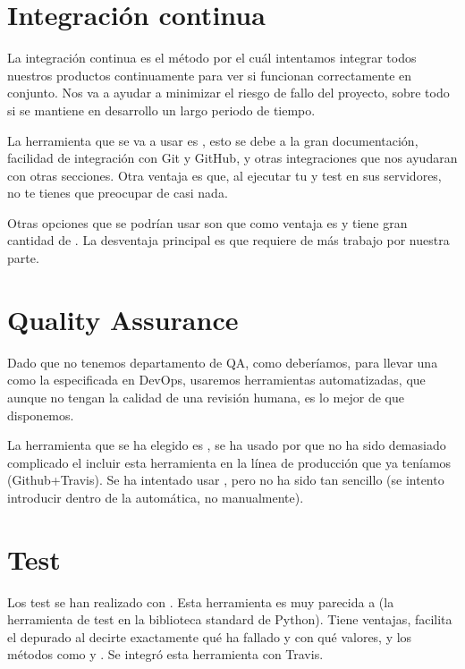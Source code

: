\section{Integración continua}

La integración continua es el método por el cuál intentamos integrar todos nuestros productos continuamente para ver si funcionan correctamente en conjunto. Nos va a ayudar a minimizar el riesgo de fallo del proyecto, sobre todo si se mantiene en desarrollo un largo periodo de tiempo.

La herramienta que se va a usar es , esto se debe a la gran documentación, facilidad de integración con Git y GitHub, y otras integraciones que nos ayudaran con otras secciones. Otra ventaja es que, al ejecutar tu  y test en sus servidores, no te tienes que preocupar de casi nada.

Otras opciones que se podrían usar son  que como ventaja es  y tiene gran cantidad de . La desventaja principal es que requiere de más trabajo por nuestra parte.


\section{Quality Assurance}

Dado que no tenemos departamento de QA, como deberíamos, para llevar una  como la especificada en DevOps, usaremos herramientas automatizadas, que aunque no tengan la calidad de una revisión humana, es lo mejor de que disponemos. 

La herramienta que se ha elegido es , se ha usado por que no ha sido demasiado complicado el incluir esta herramienta en la línea de producción que ya teníamos (Github+Travis). Se ha intentado usar , pero no ha sido tan sencillo (se intento introducir dentro de la  automática, no manualmente). 


\section{Test}

Los test se han realizado con . Esta herramienta es muy parecida a  (la herramienta de test en la biblioteca standard de Python). Tiene ventajas, facilita el depurado al decirte exactamente qué ha fallado y con qué valores, y los métodos como  y . Se integró esta herramienta con Travis.

